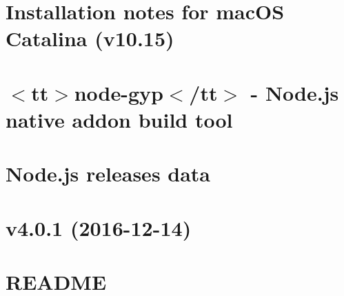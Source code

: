 \documentclass[twoside]{book}
\newcommand{\+}{\discretionary{\mbox{\scriptsize$\hookleftarrow$}}{}{}}
\begin{document}
\chapter{Installation notes for mac\+OS Catalina (v10.15)}
\label{md__c___users_vaishnavi_jadhav__desktop__developer_code_mean_stack_example_client_node_modules_node_gyp_mac_o_s__catalina}

\chapter{\texorpdfstring{$<$}{<}tt\texorpdfstring{$>$}{>}node-\/gyp\texorpdfstring{$<$}{<}/tt\texorpdfstring{$>$}{>} -\/ Node.\+js native addon build tool}
\label{md__c___users_vaishnavi_jadhav__desktop__developer_code_mean_stack_example_client_node_modules_node_gyp__r_e_a_d_m_e}

\chapter{Node.\+js releases data}
\label{md__c___users_vaishnavi_jadhav__desktop__developer_code_mean_stack_example_client_node_modules_node_releases__r_e_a_d_m_e}

\chapter{v4.0.1 (2016-\/12-\/14)}
\label{md__c___users_vaishnavi_jadhav__desktop__developer_code_mean_stack_example_client_node_modules_nopt__c_h_a_n_g_e_l_o_g}

\chapter{README}
\label{md__c___users_vaishnavi_jadhav__desktop__developer_code_mean_stack_example_client_node_modules_nopt__r_e_a_d_m_e}

\end{document}

